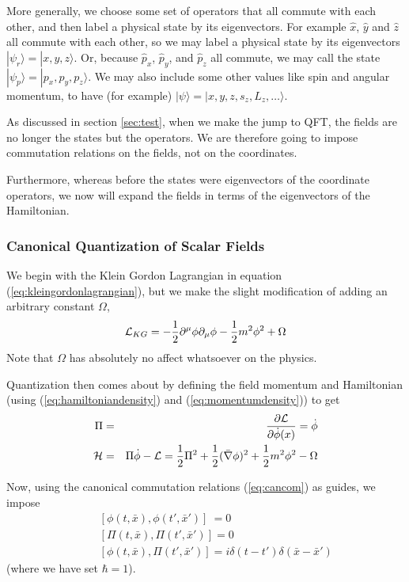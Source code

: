 \documentclass[12pt,epsf]{article}
\def\nolabel{\nonumber }
\def\nolabel{\nonumber }
\begin{document}
More generally, we choose some set of operators that all commute with
each other, and then label a physical state by its eigenvectors.  For
example $\hat x$, $\hat y$ and $\hat z$ all commute with each other, so
we may label a physical state by its eigenvectors $|\psi_r\rangle =
|x,y,z\rangle$.  Or, because $\hat p_x$, $\hat p_y$, and $\hat p_z$ all
commute, we may call the state $|\psi_p\rangle = |p_x,p_y,p_z\rangle$. 
We may also include some other values like spin and angular momentum,
to have (for example) $|\psi\rangle = |x,y,z,s_z,L_z,\ldots \rangle$.  

As discussed in section \ref{sec:test}, when we make the jump to QFT,
the fields are no longer the states but the operators.	We are
therefore going to impose commutation relations on the fields, not on
the coordinates.  

Furthermore, whereas before the states were eigenvectors of the
coordinate operators, we now will expand the fields in terms of the
eigenvectors of the Hamiltonian.  

\subsubsection{Canonical Quantization of Scalar Fields}
\label{sec:scalarcanquant}

We begin with the Klein Gordon Lagrangian in equation
(\ref{eq:kleingordonlagrangian}), but we make the slight modification
of adding an arbitrary constant $\Omega$,
\begin{eqnarray}
\mathcal{L}_{KG} = -{1\over 2}\partial^{\mu}\phi \partial_{\mu}\phi -
{1\over 2}m^2 \phi^2 + \Omega\nolabel
\end{eqnarray}	
Note that $\Omega$ has absolutely no affect whatsoever on the physics.  

Quantization then comes about by defining the field momentum and
Hamiltonian (using (\ref{eq:hamiltoniandensity}) and
(\ref{eq:momentumdensity})) to get 
\begin{eqnarray}
\Pi &=& {\partial \mathcal{L} \over \partial \dot{\phi}(x)} =
\dot{\phi} \\
\mathcal{H} &=& \Pi \dot{\phi} - \mathcal{L} = {1\over 2}\Pi^2 +
{1\over 2}(\bar \nabla \phi)^2 + {1\over 2}m^2\phi^2 - \Omega
\end{eqnarray}

Now, using the canonical commutation relations (\ref{eq:cancom}) as
guides, we impose
\begin{eqnarray}
& & \;[\phi(t,\bar x),\phi(t',\bar x')]\ = 0 \nolabel\\
& & \;[\Pi(t,\bar x),\Pi(t',\bar x')] = 0 \nolabel\\
& & \;[\phi(t,\bar x),\Pi(t',\bar x')] = i\delta(t-t')\delta(\bar x -
\bar x') \label{eq:scalarcomrels}
\end{eqnarray}
(where we have set $\hbar = 1$).  
\end{document}
